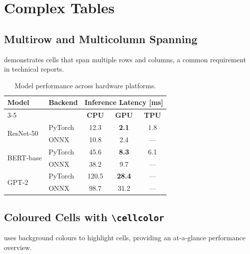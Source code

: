 \documentclass[
    language=english,
    doctype=article,
    institution=none,
    titlestyle=book,
]{../../omnilatex}
\theoremstyle{definition}
\theoremstyle{definition}
\theoremstyle{remark}
\begin{document}
\section{Complex Tables}
\label{sec:tables}

\subsection{Multirow and Multicolumn Spanning}
\label{sec:multirow}

 demonstrates cells that span multiple rows and columns,
a common requirement in technical reports.

\begin{table}[htbp]
    \centering
    \caption{Model performance across hardware platforms.}
    \label{tab:multirow}
    \begin{tabular}{@{}llccc@{}}
        \toprule
        \multirow{2}{*}{\textbf{Model}}
            & \multirow{2}{*}{\textbf{Backend}}
            & \multicolumn{3}{c}{\textbf{Inference Latency [\si{\milli\second}]}} \\
        \cmidrule(l){3-5}
            & & \textbf{CPU} & \textbf{GPU} & \textbf{TPU} \\
        \midrule
        \multirow{2}{*}{ResNet-50}
            & PyTorch  & 12.3 & \textbf{2.1} & 1.8 \\
            & ONNX     & 10.8 & 2.4           & --- \\
        \midrule
        \multirow{2}{*}{BERT-base}
            & PyTorch  & 45.6 & \textbf{8.3} & 6.1 \\
            & ONNX     & 38.2 & 9.7           & --- \\
        \midrule
        \multirow{2}{*}{GPT-2}
            & PyTorch  & 120.5 & \textbf{28.4} & --- \\
            & ONNX     & 98.7  & 31.2           & --- \\
        \bottomrule
    \end{tabular}
\end{table}


\subsection{Coloured Cells with \texorpdfstring{\texttt{\textbackslash cellcolor}}{cellcolor}}
\label{sec:coloured}

 uses background colours to highlight cells,
providing an at-a-glance performance overview.
\end{document}
